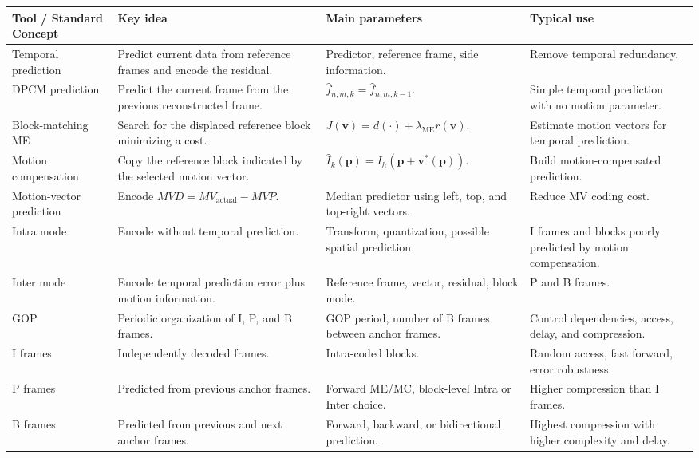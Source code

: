 \begin{center}
\begin{tabular}{|l|l|l|l|}
\hline
\textbf{Tool / Standard Concept} & \textbf{Key idea} & \textbf{Main parameters} & \textbf{Typical use} \\ \hline
Temporal prediction & Predict current data from reference frames and encode the residual. & Predictor, reference frame, side information. & Remove temporal redundancy. \\ \hline
DPCM prediction & Predict the current frame from the previous reconstructed frame. & $\hat{f}_{n,m,k} = \hat{f}_{n,m,k-1}$. & Simple temporal prediction with no motion parameter. \\ \hline
Block-matching ME & Search for the displaced reference block minimizing a cost. & $J(\mathbf{v}) = d(\cdot) + \lambda_{\text{ME}}r(\mathbf{v})$. & Estimate motion vectors for temporal prediction. \\ \hline
Motion compensation & Copy the reference block indicated by the selected motion vector. & $\hat{I}_k(\mathbf{p}) = I_h(\mathbf{p}+\mathbf{v}^*(\mathbf{p}))$. & Build motion-compensated prediction. \\ \hline
Motion-vector prediction & Encode $MVD = MV_{\text{actual}} - MVP$. & Median predictor using left, top, and top-right vectors. & Reduce MV coding cost. \\ \hline
Intra mode & Encode without temporal prediction. & Transform, quantization, possible spatial prediction. & I frames and blocks poorly predicted by motion compensation. \\ \hline
Inter mode & Encode temporal prediction error plus motion information. & Reference frame, vector, residual, block mode. & P and B frames. \\ \hline
GOP & Periodic organization of I, P, and B frames. & GOP period, number of B frames between anchor frames. & Control dependencies, access, delay, and compression. \\ \hline
I frames & Independently decoded frames. & Intra-coded blocks. & Random access, fast forward, error robustness. \\ \hline
P frames & Predicted from previous anchor frames. & Forward ME/MC, block-level Intra or Inter choice. & Higher compression than I frames. \\ \hline
B frames & Predicted from previous and next anchor frames. & Forward, backward, or bidirectional prediction. & Highest compression with higher complexity and delay. \\ \hline

\end{tabular}
\end{center}
